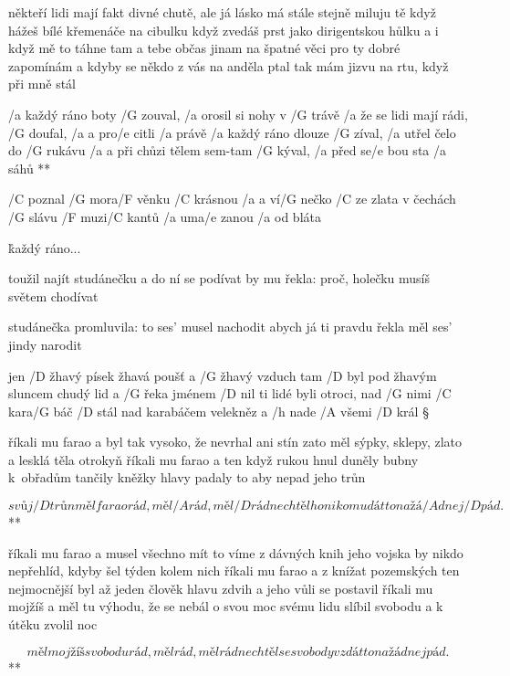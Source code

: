 někteří lidi mají fakt divné chutě, ale
já lásko má stále stejně miluju tě
když hážeš bílé křemenáče na cibulku
když zvedáš prst jako dirigentskou hůlku
a i když mě to táhne tam a tebe občas jinam
na špatné věci pro ty dobré zapomínám
a kdyby se někdo z vás na anděla ptal
tak mám jizvu na rtu, když při mně stál





\R  /a každý ráno boty /G zouval,  /a orosil si nohy v /G trávě
    /a že se lidi mají rádi, /G doufal, /a a pro/e citli /a právě
    /a každý ráno dlouze /G zíval, /a utřel čelo do /G rukávu
    /a a při chůzi tělem sem-tam /G kýval, /a před se/e bou sta /a sáhů **

/C poznal /G mora/F věnku /C krásnou
/a a ví/G nečko /C ze zlata
v čechách /G slávu /F muzi/C kantů
/a uma/e zanou /a od bláta

\r  každý ráno...

toužil najít studánečku
a do ní se podívat
by mu řekla: proč, holečku
musíš světem chodívat \s

studánečka promluvila:
to ses' musel nachodit
abych já ti pravdu řekla
měl ses' jindy narodit

\rr




jen /D žhavý písek žhavá poušť a /G žhavý vzduch tam /D byl
pod žhavým sluncem chudý lid a /G řeka jménem /D nil
ti lidé byli otroci, nad /G nimi /C kara/G báč /D stál
nad karabáčem velekněz a /h nade /A všemi /D král \S

říkali mu farao a byl tak vysoko, že nevrhal ani stín
zato měl sýpky, sklepy, zlato a lesklá těla otrokyň \s
říkali mu farao a ten když rukou hnul duněly bubny k~obřadům
tančily kněžky hlavy padaly to aby nepad jeho trůn \s

\R \[ svůj /D trůn měl farao rád, měl /A rád, měl /D rád
   nechtěl ho nikomu dát to na žá/A dnej /D pád. \]**

říkali mu farao a musel všechno mít to víme z dávných knih
jeho vojska by nikdo nepřehlíd, kdyby šel týden kolem nich \s
říkali mu farao a z knížat pozemských ten nejmocnější byl
až jeden člověk hlavu zdvih a jeho vůli se postavil \s
říkali mu mojžíš a měl tu výhodu, že se nebál o svou moc
svému lidu slíbil svobodu a k útěku zvolil noc \s

\R \[ měl mojžíš svobodu rád, měl rád, měl rád
   nechtěl se svobody vzdát to na žádnej pád.\]**

